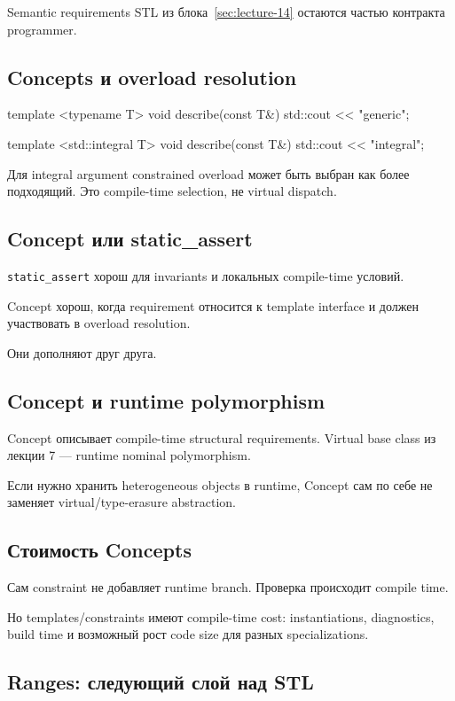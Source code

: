 Semantic requirements STL из блока~\ref{sec:lecture-14} остаются частью
контракта programmer.

\subsection{Concepts и overload resolution}

\begin{cppcode}
template <typename T>
void describe(const T&) {
    std::cout << "generic";
}

template <std::integral T>
void describe(const T&) {
    std::cout << "integral";
}
\end{cppcode}

Для integral argument constrained overload может быть выбран как более
подходящий. Это compile-time selection, не virtual dispatch.

\subsection{Concept или static\_assert}

\texttt{static\_assert} хорош для invariants и локальных compile-time условий.

Concept хорош, когда requirement относится к template interface и должен
участвовать в overload resolution.

Они дополняют друг друга.

\subsection{Concept и runtime polymorphism}

Concept описывает compile-time structural requirements. Virtual base class из
лекции 7 --- runtime nominal polymorphism.

Если нужно хранить heterogeneous objects в runtime, Concept сам по себе не
заменяет virtual/type-erasure abstraction.

\subsection{Стоимость Concepts}

Сам constraint не добавляет runtime branch. Проверка происходит compile time.

Но templates/constraints имеют compile-time cost: instantiations, diagnostics,
build time и возможный рост code size для разных specializations.

\subsection{Ranges: следующий слой над STL}

